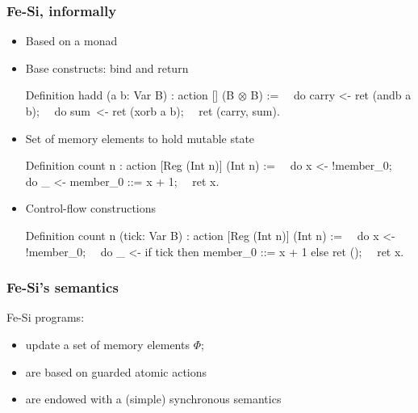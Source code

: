 \documentclass[9pt]{beamer}
\newcommand\fesi{Fe-Si}
\begin{document}
\begin{frame}[fragile]
  \frametitle{Fe-Si, informally}
  \begin{itemize}
  \item Based on a \alert{monad}
  \item Base constructs: bind and return
    \begin{coq}
Definition hadd (a b: Var B) : action [] (B $\otimes$ B) :=
$\quad$do carry <- ret (andb a b); 
$\quad$do sum   $\,$<- ret (xorb a b);
$\quad$ret (carry, sum).  
\end{coq}
\pause
\item Set of memory elements to hold mutable state
\begin{coq}
Definition count n : action [Reg (Int n)] (Int n) :=
$\quad$do x <- !member_0;
$\quad$do _ <- member_0 ::= x + 1;
$\quad$ret x. 
\end{coq}
\pause
\item Control-flow constructions
\begin{coq}
Definition count n (tick: Var B) : action [Reg (Int n)] (Int n) :=
$\quad$do x <- !member_0;
$\quad$do _ <- if tick then {member_0 ::= x + 1} else {ret ()}; 
$\quad$ret x. 
\end{coq}
  \end{itemize}
\end{frame}
\begin{frame}[fragile]
  \frametitle{Fe-Si's semantics}

  \fesi{} programs:
  \begin{itemize}
  \item update a set of \alert{memory elements} $\Phi$;
    \\
  \item are based on \alert{guarded atomic actions} 
    \\
    \begin{center}
    \end{center}
  \item are endowed with a (simple) \alert{synchronous semantics}
    \\
    \begin{center}
    \end{center}
  \end{itemize}
\end{frame}
\end{document}
